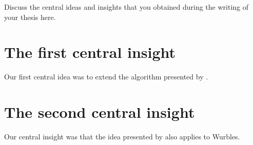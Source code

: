 Discuss the central ideas and insights that you obtained during the writing of your thesis here.

\section{The first central insight}
\label{sec:mainidea-one}

Our first central idea was to extend the algorithm presented by \cite{Cockx2020}.

\section{The second central insight}
\label{sec:mainidea-two}

Our central insight was that the idea presented by \cite{Cook1990object,Cook2009understanding} also applies to Wurbles.
